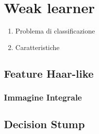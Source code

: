 
\section{Weak learner}
\label{sec:weak_learner}
\begin{enumerate}
    \item Problema di classificazione
    \item Caratteristiche
\end{enumerate}

\subsection{Feature Haar-like}
\label{sub:feature_haar_like}

\subsubsection{Immagine Integrale}
\label{subs:immagine_integrale}

\subsection{Decision Stump}
\label{subs:decision_stump}
